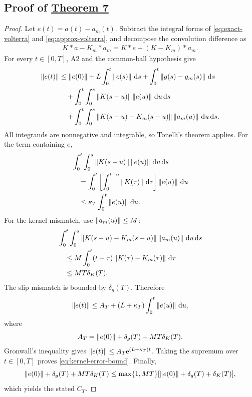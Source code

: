 \subsection{Proof of \hyperref[thm:kernel-error]{Theorem 7}}
\label{app:kernel-error-proof}

\begin{proof}
Let $e(t)=a(t)-a_m(t)$. Subtract the integral forms of
\eqref{eq:exact-volterra} and \eqref{eq:approx-volterra}, and decompose the
convolution difference as
\begin{align}
 K*a-K_m*a_m
 =K*e+(K-K_m)*a_m.
 \label{eq:convolution-decomposition}
\end{align}
For every $t\in[0,T]$, A2 and the common-ball hypothesis give
\begin{align}
 \left\lVert e(t)\right\rVert
 &\le\left\lVert e(0)\right\rVert
 +L\int_0^t\left\lVert e(s)\right\rVert\,\mathrm{d} s
 +\int_0^t\left\lVert g(s)-g_m(s)\right\rVert\,\mathrm{d} s \notag\\
 &\quad+
 \int_0^t\int_0^s
 \left\lVert K(s-u)\right\rVert\left\lVert e(u)\right\rVert\,\mathrm{d} u\,\mathrm{d} s \notag\\
 &\quad+
 \int_0^t\int_0^s
 \left\lVert K(s-u)-K_m(s-u)\right\rVert
 \left\lVert a_m(u)\right\rVert\,\mathrm{d} u\,\mathrm{d} s.
 \label{eq:kernel-error-pre-fubini}
\end{align}
All integrands are nonnegative and integrable, so Tonelli's theorem applies.
For the term containing $e$,
\begin{align}
 &\int_0^t\int_0^s
 \left\lVert K(s-u)\right\rVert\left\lVert e(u)\right\rVert\,\mathrm{d} u\,\mathrm{d} s \notag\\
 &\quad=
 \int_0^t
 \left[\int_0^{t-u}\left\lVert K(\tau)\right\rVert\,\mathrm{d}\tau\right]
 \left\lVert e(u)\right\rVert\,\mathrm{d} u \notag\\
 &\quad\le
 \kappa_T\int_0^t\left\lVert e(u)\right\rVert\,\mathrm{d} u.
 \label{eq:exact-kernel-error-term}
\end{align}
For the kernel mismatch, use $\left\lVert a_m(u)\right\rVert\le M$:
\begin{align}
 &\int_0^t\int_0^s
 \left\lVert K(s-u)-K_m(s-u)\right\rVert
 \left\lVert a_m(u)\right\rVert\,\mathrm{d} u\,\mathrm{d} s \notag\\
 &\quad\le
 M\int_0^t(t-\tau)\left\lVert K(\tau)-K_m(\tau)\right\rVert\,\mathrm{d}\tau \notag\\
 &\quad\le MT\delta_K(T).
 \label{eq:kernel-mismatch-term}
\end{align}
The slip mismatch is bounded by $\delta_g(T)$. Therefore
\begin{equation}
 \left\lVert e(t)\right\rVert
 \le A_T+(L+\kappa_T)
 \int_0^t\left\lVert e(u)\right\rVert\,\mathrm{d} u,
 \label{eq:gronwall-kernel}
\end{equation}
where
\begin{equation}
 A_T=\left\lVert e(0)\right\rVert+\delta_g(T)+MT\delta_K(T).
 \label{eq:AT}
\end{equation}
Gronwall's inequality gives
$\left\lVert e(t)\right\rVert\le A_T\mathrm{e}^{(L+\kappa_T)t}$. Taking the supremum over
$t\in[0,T]$ proves \eqref{eq:kernel-error-bound}. Finally,
\begin{equation}
 \left\lVert e(0)\right\rVert+\delta_g(T)+MT\delta_K(T)
 \le\max\{1,MT\}
 [\left\lVert e(0)\right\rVert+\delta_g(T)+\delta_K(T)],
 \label{eq:CT-grouping}
\end{equation}
which yields the stated $C_T$.
\end{proof}
